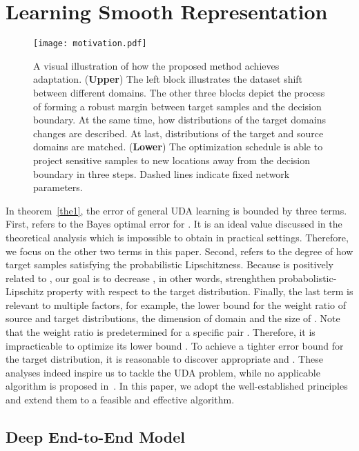 \documentclass[10pt,twocolumn,letterpaper]{article}
\begin{document}
\section{Learning Smooth Representation}
\label{ourmethod}

\begin{figure*}[htp]
\centering
\texttt{[image: motivation.pdf]}
\caption{A visual illustration of how the proposed method achieves adaptation. ({\bf Upper}) The left block illustrates the dataset shift between different domains. The other three blocks depict the process of forming a robust margin between target samples and the decision boundary. At the same time, how distributions of the target domains changes are described. At last, distributions of the target and source domains are matched. ({\bf Lower}) The optimization schedule is able to project sensitive samples to new locations away from the decision boundary in three steps. Dashed lines indicate fixed network parameters.}
\label{fig:motivation}
\end{figure*} 

In theorem~\ref{the1}, the error of general UDA learning is bounded by three terms. First,  refers to the Bayes optimal error for . It is an ideal value discussed in the theoretical analysis which is impossible to obtain in practical settings. Therefore, we focus on the other two terms in this paper. Second,  refers to the degree of how target samples satisfying the probabilistic Lipschitzness. Because  is positively related to , our goal is to decrease , in other words, strenghthen probabolistic-Lipschitz property with respect to the target distribution. Finally, the last term is relevant to multiple factors, for example, the lower bound  for the weight ratio of source and target distributions, the dimension of domain  and the size of . Note that the weight ratio  is predetermined for a specific pair . Therefore, it is impracticable to optimize its lower bound . To achieve a tighter error bound for the target distribution, it is reasonable to discover appropriate  and . These analyses indeed inspire us to tackle the UDA problem, while no applicable algorithm is proposed in~\cite{Ben-David2014}. In this paper, we adopt the well-established principles and extend them to a feasible and effective algorithm.

\subsection{Deep End-to-End Model}
\label{deep}
\end{document}
